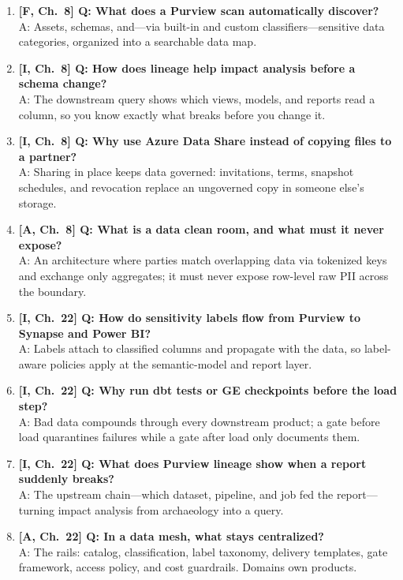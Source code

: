 \begin{enumerate}
    \item \textbf{[F, Ch.~8] Q: What does a Purview scan automatically discover?}\\
    A: Assets, schemas, and---via built-in and custom classifiers---sensitive data categories, organized into a searchable data map.
    \item \textbf{[I, Ch.~8] Q: How does lineage help impact analysis before a schema change?}\\
    A: The downstream query shows which views, models, and reports read a column, so you know exactly what breaks before you change it.
    \item \textbf{[I, Ch.~8] Q: Why use Azure Data Share instead of copying files to a partner?}\\
    A: Sharing in place keeps data governed: invitations, terms, snapshot schedules, and revocation replace an ungoverned copy in someone else's storage.
    \item \textbf{[A, Ch.~8] Q: What is a data clean room, and what must it never expose?}\\
    A: An architecture where parties match overlapping data via tokenized keys and exchange only aggregates; it must never expose row-level raw PII across the boundary.
    \item \textbf{[I, Ch.~22] Q: How do sensitivity labels flow from Purview to Synapse and Power BI?}\\
    A: Labels attach to classified columns and propagate with the data, so label-aware policies apply at the semantic-model and report layer.
    \item \textbf{[I, Ch.~22] Q: Why run dbt tests or GE checkpoints before the load step?}\\
    A: Bad data compounds through every downstream product; a gate before load quarantines failures while a gate after load only documents them.
    \item \textbf{[I, Ch.~22] Q: What does Purview lineage show when a report suddenly breaks?}\\
    A: The upstream chain---which dataset, pipeline, and job fed the report---turning impact analysis from archaeology into a query.
    \item \textbf{[A, Ch.~22] Q: In a data mesh, what stays centralized?}\\
    A: The rails: catalog, classification, label taxonomy, delivery templates, gate framework, access policy, and cost guardrails. Domains own products.
\end{enumerate}

